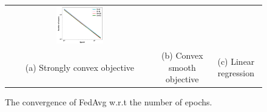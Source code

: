 \begin{figure}
\begin{tabular}{ccc}
	\includegraphics[width=0.33\textwidth]{fig/paper-linregression-newspeedupEpochsRounds-min-linearregressionw8a-epsilon002-reg0.pdf} \\
(a) Strongly convex objective & (b) Convex smooth objective & (c) Linear regression
	\end{tabular}
\caption{The convergence of FedAvg w.r.t the number of epochs. }
\label{fig:e}
\end{figure}



